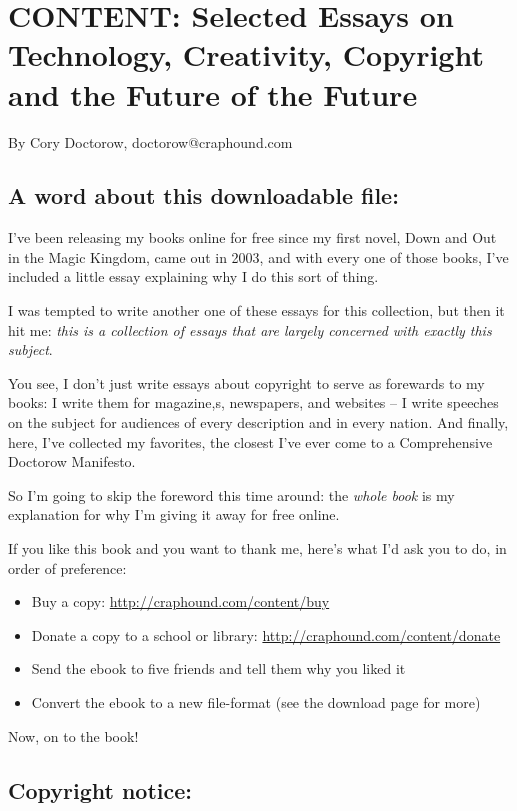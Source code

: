 

\section{CONTENT: Selected Essays on Technology, Creativity, Copyright and the Future of the Future}

By Cory Doctorow, doctorow@craphound.com

\subsection{A word about this downloadable file:}

I've been releasing my books online for free since my first novel,
Down and Out in the Magic Kingdom, came out in 2003, and with every
one of those books, I've included a little essay explaining why I
do this sort of thing.

I was tempted to write another one of these essays for this
collection, but then it hit me:
\emph{this is a collection of essays that are largely concerned with exactly this subject}.

You see, I don't just write essays about copyright to serve as
forewards to my books: I write them for magazine,s, newspapers, and
websites -- I write speeches on the subject for audiences of every
description and in every nation. And finally, here, I've collected
my favorites, the closest I've ever come to a Comprehensive
Doctorow Manifesto.

So I'm going to skip the foreword this time around: the
\emph{whole book} is my explanation for why I'm giving it away
for free online.

If you like this book and you want to thank me, here's what I'd ask
you to do, in order of preference:

\begin{itemize}
\item
  Buy a copy:
  \href{http://craphound.com/content/buy}{http://craphound.com/content/buy}
\item
  Donate a copy to a school or library:
  \href{http://craphound.com/content/donate}{http://craphound.com/content/donate}
\item
  Send the ebook to five friends and tell them why you liked it
\item
  Convert the ebook to a new file-format (see the download page for
  more)
\end{itemize}
Now, on to the book!

\subsection{Copyright notice:}

